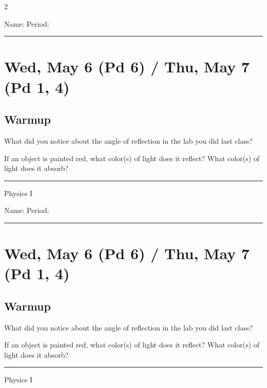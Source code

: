 \documentclass[10pt,landscape]{exam}
\def\todayDate{Wed, May 6 (Pd 6) / Thu, May 7 (Pd 1, 4)}
\def\content{

\begin{questions}

  \question What did you notice about the angle of reflection in the lab you did last class? \vs 

  \question If an object is painted red, what color(s) of light does it reflect?  What color(s) of light does it absorb? \vs


\end{questions}


}
\begin{document}
\pagestyle{empty}

\setlength{\columnsep}{0.8in}
\begin{multicols*}{2}

\noindent  
Name: \hfill Period: \hspace{5em}
\vspace{0.5em}
\hrule

\section*{\todayDate}
\subsection*{Warmup}

\content

\vfill
\hrule
\vspace{0.5em}
\hfill {\sc Physics I}

\columnbreak

\noindent  
Name: \hfill Period: \hspace{5em}
\vspace{0.5em}
\hrule

\section*{\todayDate}
\subsection*{Warmup}

\content

\vfill
\hrule
\vspace{0.5em}
\hfill {\sc Physics I}

\end{multicols*}
\end{document}
